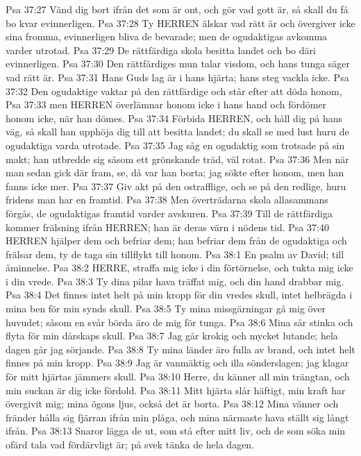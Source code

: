 Psa 37:27  Vänd dig bort ifrån det som är ont, och gör vad gott är, så skall du få bo kvar evinnerligen.
Psa 37:28  Ty HERREN älskar vad rätt är och övergiver icke sina fromma, evinnerligen bliva de bevarade; men de ogudaktigas avkomma varder utrotad.
Psa 37:29  De rättfärdiga skola besitta landet och bo däri evinnerligen.
Psa 37:30  Den rättfärdiges mun talar visdom, och hans tunga säger vad rätt är.
Psa 37:31  Hans Guds lag är i hans hjärta; hans steg vackla icke.
Psa 37:32  Den ogudaktige vaktar på den rättfärdige och står efter att döda honom,
Psa 37:33  men HERREN överlämnar honom icke i hans hand och fördömer honom icke, när han dömes.
Psa 37:34  Förbida HERREN, och håll dig på hans väg, så skall han upphöja dig till att besitta landet; du skall se med lust huru de ogudaktiga varda utrotade.
Psa 37:35  Jag såg en ogudaktig som trotsade på sin makt; han utbredde sig såsom ett grönskande träd, väl rotat.
Psa 37:36  Men när man sedan gick där fram, se, då var han borta; jag sökte efter honom, men han fanns icke mer.
Psa 37:37  Giv akt på den ostrafflige, och se på den redlige, huru fridens man har en framtid.
Psa 37:38  Men överträdarna skola allasammans förgås, de ogudaktigas framtid varder avskuren.
Psa 37:39  Till de rättfärdiga kommer frälsning ifrån HERREN; han är deras värn i nödens tid.
Psa 37:40  HERREN hjälper dem och befriar dem; han befriar dem från de ogudaktiga och frälsar dem, ty de taga sin tillflykt till honom.
Psa 38:1  En psalm av David; till åminnelse.
Psa 38:2  HERRE, straffa mig icke i din förtörnelse, och tukta mig icke i din vrede.
Psa 38:3  Ty dina pilar hava träffat mig, och din hand drabbar mig.
Psa 38:4  Det finnes intet helt på min kropp för din vredes skull, intet helbrägda i mina ben för min synds skull.
Psa 38:5  Ty mina missgärningar gå mig över huvudet; såsom en svår börda äro de mig för tunga.
Psa 38:6  Mina sår stinka och flyta för min dårskaps skull.
Psa 38:7  Jag går krokig och mycket lutande; hela dagen går jag sörjande.
Psa 38:8  Ty mina länder äro fulla av brand, och intet helt finnes på min kropp.
Psa 38:9  Jag är vanmäktig och illa sönderslagen; jag klagar för mitt hjärtas jämmers skull.
Psa 38:10  Herre, du känner all min trängtan, och min suckan är dig icke fördold.
Psa 38:11  Mitt hjärta slår häftigt, min kraft har övergivit mig; mina ögons ljus, också det är borta.
Psa 38:12  Mina vänner och fränder hålla sig fjärran ifrån min plåga, och mina närmaste hava ställt sig långt ifrån.
Psa 38:13  Snaror lägga de ut, som stå efter mitt liv, och de som söka min ofärd tala vad fördärvligt är; på svek tänka de hela dagen.
